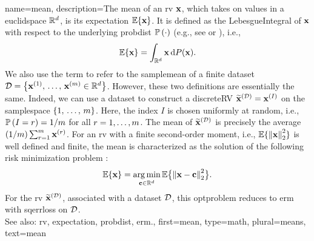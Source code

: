 {name={mean},
	description={The mean of an \gls{rv} ${\bf x}$, which takes 
 		on values in a \gls{euclidspace} $\mathbb{R}^{d}$, is its 
 		\gls{expectation} $\mathbb{E}\{{\bf x}\}$. It is defined as the \gls{LebesgueIntegral}
 		of ${\bf x}$ with respect to the underlying \gls{probdist} $\mathbb{P}\left(\cdot\right)$ (e.g., 
		see \cite{RudinBookPrinciplesMatheAnalysis} or \cite{BillingsleyProbMeasure}), i.e.,
		\[
			\mathbb{E}\{{\bf x}\} = \int_{\mathbb{R}^{d}} {\bf x} \, \mathrm{d}P({\bf x}).
		\]  
		We also use the term to refer to the \gls{samplemean} of a finite \gls{dataset}
		$\mathcal{D} = \left\{ {\bf x}^{(1)}, \,\ldots, \,{\bf x}^{(m)} \in \mathbb{R}^{d}\right\}$. 
		However, these two definitions are essentially the same. Indeed, we can use 
		a \gls{dataset} to construct a \gls{discreteRV} $\widetilde{{\bf x}}^{(\mathcal{D})}={\bf x}^{(I)}$ on 
		the \gls{samplespace} $\{1, \,\ldots, \,m\}$. Here, the index $I$ is 
		chosen uniformly at random, i.e., $\mathbb{P}\left(I=r\right)=1/m$ for all 
		$r=1,\ldots,m$. The mean of $\widetilde{{\bf x}}^{(\mathcal{D})}$ is 
		precisely the average $({1}/{m}) \sum_{r=1}^{m} {\bf x}^{(r)}$.
		For an \gls{rv} with a finite second-order moment, i.e., 
		$\expect\{ \normgeneric{\featurevec}{2}^{2} \}$ is well defined and finite, 
		the mean is characterized as the solution of the 
		following \gls{risk} minimization problem \cite{BertsekasProb}:
		\[
			\expect\{\featurevec\} = \argmin_{\vc \in \mathbb{R}^{\nrfeatures}} 
			\expect \big\{\normgeneric{\featurevec - \vc}{2}^{2}\big \}.
		\]
		For the \gls{rv} $\widetilde{{\bf x}}^{(\mathcal{D})}$, associated with a \gls{dataset} $\mathcal{D}$, 
		this \gls{optproblem} reduces to \gls{erm} with \gls{sqerrloss} on $\mathcal{D}$. 
		\\ 
		See also: \gls{rv}, \gls{expectation}, \gls{probdist}, \gls{erm}.}, 
	first={mean}, 
	type=math,
	plural={means},
	text={mean} 
}

